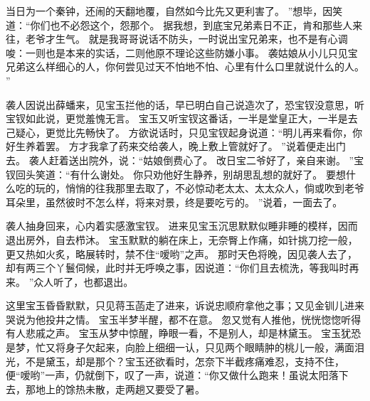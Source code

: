 当日为一个秦钟，还闹的天翻地覆，自然如今比先又更利害了。
”想毕，因笑道：“你们也不必怨这个，怨那个。
据我想，到底宝兄弟素日不正，肯和那些人来往，老爷才生气。
就是我哥哥说话不防头，一时说出宝兄弟来，也不是有心调唆：一则也是本来的实话，二则他原不理论这些防嫌小事。
袭姑娘从小儿只见宝兄弟这么样细心的人，你何尝见过天不怕地不怕、心里有什么口里就说什么的人。
”\par
袭人因说出薛蟠来，见宝玉拦他的话，早已明白自己说造次了，恐宝钗没意思，听宝钗如此说，更觉羞愧无言。
宝玉又听宝钗这番话，一半是堂皇正大，一半是去己疑心，更觉比先畅快了。
方欲说话时，只见宝钗起身说道：“明儿再来看你，你好生养着罢。
方才我拿了药来交给袭人，晚上敷上管就好了。
”说着便走出门去。
袭人赶着送出院外，说：“姑娘倒费心了。
改日宝二爷好了，亲自来谢。
”宝钗回头笑道：“有什么谢处。
你只劝他好生静养，别胡思乱想的就好了。
要想什么吃的玩的，悄悄的往我那里去取了，不必惊动老太太、太太众人，倘或吹到老爷耳朵里，虽然彼时不怎么样，将来对景，终是要吃亏的。
”说着，一面去了。
\par
袭人抽身回来，心内着实感激宝钗。
进来见宝玉沉思默默似睡非睡的模样，因而退出房外，自去栉沐。
宝玉默默的躺在床上，无奈臀上作痛，如针挑刀挖一般，更又热如火炙，略展转时，禁不住“嗳哟”之声。
那时天色将晚，因见袭人去了，却有两三个丫鬟伺候，此时并无呼唤之事，因说道：“你们且去梳洗，等我叫时再来。
”众人听了，也都退出。
\par
这里宝玉昏昏默默，只见蒋玉菡走了进来，诉说忠顺府拿他之事；又见金钏儿进来哭说为他投井之情。
宝玉半梦半醒，都不在意。
忽又觉有人推他，恍恍惚惚听得有人悲戚之声。
宝玉从梦中惊醒，睁眼一看，不是别人，却是林黛玉。
宝玉犹恐是梦，忙又将身子欠起来，向脸上细细一认，只见两个眼睛肿的桃儿一般，满面泪光，不是黛玉，却是那个？宝玉还欲看时，怎奈下半截疼痛难忍，支持不住，便“嗳哟”一声，仍就倒下，叹了一声，说道：“你又做什么跑来！虽说太阳落下去，那地上的馀热未散，走两趟又要受了暑。
